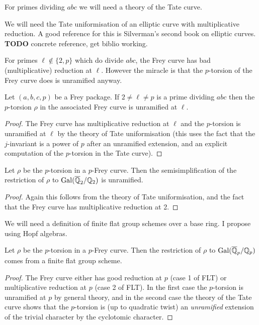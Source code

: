 For primes dividing $abc$ we will need a theory of the Tate curve.

\begin{definition}\label{Tate_curve_uniformisation} We will need the Tate uniformisation of an elliptic curve with
  multiplicative reduction. A good reference for this is Silverman's second book on elliptic curves. {\bf TODO
  } concrete reference, get biblio working.
\end{definition}

For primes $\ell\not\in\{2,p\}$ which do divide $abc$, the Frey curve has bad (multiplicative) reduction at $\ell$. However the miracle is that the $p$-torsion of the Frey curve does is unramified anyway.

\begin{theorem}\label{Frey_curve_mod_p_rep_at_bad_primes}

  Let $(a,b,c,p)$ be a Frey package. If $2\ne\ell\ne p$ is a prime dividing $abc$ then the 
  $p$-torsion $\rho$ in the associated Frey curve is unramified at $\ell$.
\end{theorem}
\begin{proof} The Frey curve has multiplicative reduction at $\ell$ and the $p$-torsion is unramified at $\ell$ by the theory of Tate uniformisation (this uses the fact that the $j$-invariant is a power of $p$ after an unramified extension, and an explicit computation of the $p$-torsion in the Tate curve).
\end{proof}

\begin{theorem}\label{Frey_curve_mod_p_rep_at_2} Let $\rho$ be the $p$-torsion in a $p$-Frey curve. Then the semisimplification of the restriction of $\rho$ to $\operatorname{Gal}(\overline{\mathbb{Q}}_2/\mathbb{Q}_2)$ is unramified.
\end{theorem}
\begin{proof}
  Again this follows from the theory of Tate uniformisation, and the fact that the Frey curve has multiplicative reduction at 2.
\end{proof}

\begin{definition}\label{finite_flat_group_scheme} We will need a definition of finite flat group schemes over a base ring. I propose using Hopf algebras.
\end{definition}
  
\begin{theorem}\label{Frey_curve_mod_p_rep_at_p} Let $\rho$ be the $p$-torsion in a $p$-Frey curve. Then the restriction of $\rho$ to $\operatorname{Gal}(\overline{\mathbb{Q}}_p/\mathbb{Q}_p)$ comes from a finite flat group scheme.
\end{theorem}
\begin{proof} The Frey curve either has good reduction at $p$ (case 1 of FLT) or multiplicative reduction at $p$ (case 2 of FLT). In the first case the $p$-torsion is unramified at $p$ by general theory, and in the second case the theory of the Tate curve shows that the $p$-torsion is (up to quadratic twist) an \emph{unramified} extension of the trivial character by the cyclotomic character.
\end{proof}
